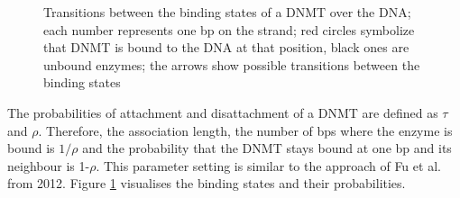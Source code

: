 \begin{figure}[h]
\centering
{}
\caption{Transitions between the binding states of a DNMT over the DNA; each number represents one bp on the strand; red circles symbolize that DNMT is bound to the DNA at that position, black ones are unbound enzymes; the arrows show possible transitions between the binding states}
\label{rho}
\end{figure}
The probabilities of attachment and disattachment of a \ac{DNMT} are defined as $\tau$ and $\rho$. Therefore, the association length, the number of \acp{bp} where the enzyme is bound is $1/\rho$ and the probability that the \ac{DNMT} stays bound at one \ac{bp} and its neighbour is 1-$\rho$. This parameter setting is similar to the approach of Fu et al. from 2012.\cite{Fu} Figure \ref{rho} visualises the binding states and their probabilities.\\

